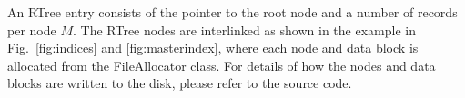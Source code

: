 An RTree entry consists of the pointer to the root node and a number
of records per node $M$. The RTree nodes are interlinked as shown in
the example in Fig.~\ref{fig:indices} and \ref{fig:masterindex}, where
each node and data block is allocated from the FileAllocator class.
For details of how the nodes and data blocks are written to the disk,
please refer to the source code.
